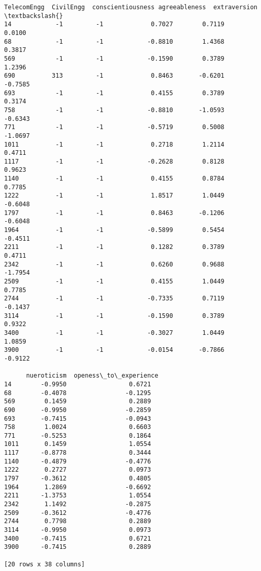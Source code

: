\documentclass[11pt]{article}
\begin{document}
\begin{tcolorbox}[breakable, size=fbox, boxrule=.5pt, pad at break*=1mm, opacityfill=0]
\begin{Verbatim}[commandchars=\\\{\}]
     TelecomEngg  CivilEngg  conscientiousness agreeableness  extraversion  \textbackslash{}
14            -1         -1             0.7027        0.7119        0.0100
68            -1         -1            -0.8810        1.4368        0.3817
569           -1         -1            -0.1590        0.3789        1.2396
690          313         -1             0.8463       -0.6201       -0.7585
693           -1         -1             0.4155        0.3789        0.3174
758           -1         -1            -0.8810       -1.0593       -0.6343
771           -1         -1            -0.5719        0.5008       -1.0697
1011          -1         -1             0.2718        1.2114        0.4711
1117          -1         -1            -0.2628        0.8128        0.9623
1140          -1         -1             0.4155        0.8784        0.7785
1222          -1         -1             1.8517        1.0449       -0.6048
1797          -1         -1             0.8463       -0.1206       -0.6048
1964          -1         -1            -0.5899        0.5454       -0.4511
2211          -1         -1             0.1282        0.3789        0.4711
2342          -1         -1             0.6260        0.9688       -1.7954
2509          -1         -1             0.4155        1.0449        0.7785
2744          -1         -1            -0.7335        0.7119       -0.1437
3114          -1         -1            -0.1590        0.3789        0.9322
3400          -1         -1            -0.3027        1.0449        1.0859
3900          -1         -1            -0.0154       -0.7866       -0.9122

      nueroticism  openess\_to\_experience
14        -0.9950                 0.6721
68        -0.4078                -0.1295
569        0.1459                 0.2889
690       -0.9950                -0.2859
693       -0.7415                -0.0943
758        1.0024                 0.6603
771       -0.5253                 0.1864
1011       0.1459                 1.0554
1117      -0.8778                 0.3444
1140      -0.4879                -0.4776
1222       0.2727                 0.0973
1797      -0.3612                 0.4805
1964       1.2869                -0.6692
2211      -1.3753                 1.0554
2342       1.1492                -0.2875
2509      -0.3612                -0.4776
2744       0.7798                 0.2889
3114      -0.9950                 0.0973
3400      -0.7415                 0.6721
3900      -0.7415                 0.2889

[20 rows x 38 columns]
\end{Verbatim}
\end{tcolorbox}
        
\end{document}

